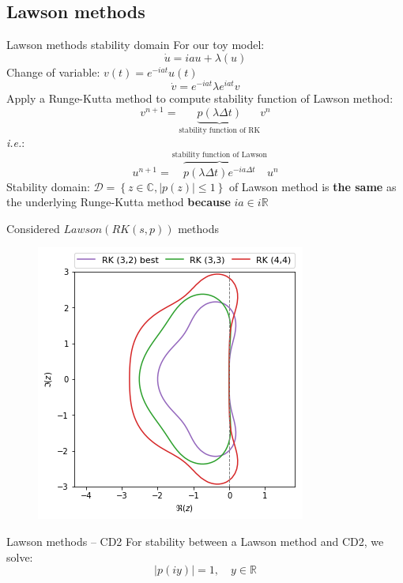 \documentclass{beamer}
\begin{document}
\subsection{Lawson methods}
\begin{frame}{Lawson methods stability domain}
  For our toy model:
  $$
    \dot{u} = iau + \lambda(u)
  $$
  Change of variable: $v(t) = e^{-iat}u(t)$
  $$
    \dot{v} = e^{-iat}\lambda e^{iat}v
  $$
  Apply a Runge-Kutta method to compute stability function of Lawson method:
  $$
    v^{n+1} = \underbrace{p(\lambda\Delta t)}_{\text{stability function of RK}}v^n
  $$
  \emph{i.e.}:
  $$
    u^{n+1} = \overbrace{p(\lambda\Delta t)e^{-ia\Delta t}}^{\text{stability function of Lawson}}u^n
  $$
  Stability domain: $\mathcal{D}=\left\{z\in\mathbb{C},|p(z)|\leq 1\right\}$ of Lawson method is \textbf{the same} as the underlying Runge-Kutta method \textbf{because} $ia\in i\mathbb{R}$
\end{frame}
\begin{frame}{Considered $Lawson(RK(s,p))$ methods}
  \begin{figure}\centering
    \includegraphics[height=0.8\textheight]{img/rk_sd.png}
  \end{figure}
\end{frame}
\begin{frame}{Lawson methods -- CD2}
  For stability between a Lawson method and CD2, we solve:
  $$
    |p(iy)| = 1,\quad y\in\mathbb{R}
  $$
\end{frame}
\end{document}
